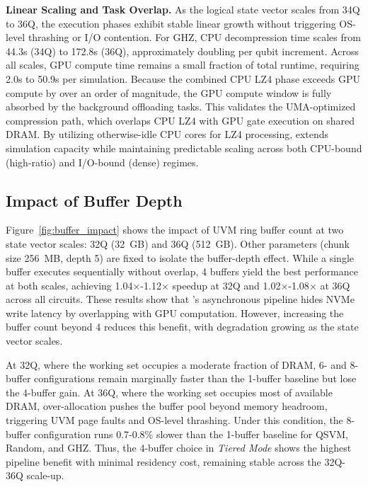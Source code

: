 \noindent\textbf{Linear Scaling and Task Overlap. }As the logical state vector scales from 34Q to 36Q, the execution phases exhibit stable linear growth without triggering OS-level thrashing or I/O contention. For GHZ, CPU decompression time scales from 44.3s (34Q) to 172.8s (36Q), approximately doubling per qubit increment. Across all scales, GPU compute time remains a small fraction of total runtime, requiring 2.0s to 50.9s per simulation. Because the combined CPU LZ4 phase exceeds GPU compute by over an order of magnitude, the GPU compute window is fully absorbed by the background offloading tasks. This validates the UMA-optimized compression path, which overlaps CPU LZ4 with GPU gate execution on shared DRAM. By utilizing otherwise-idle CPU cores for LZ4 processing, \EdgeQuantum extends simulation capacity while maintaining predictable scaling across both CPU-bound (high-ratio) and I/O-bound (dense) regimes.



\subsection{Impact of Buffer Depth}
Figure~\ref{fig:buffer_impact} shows the impact of UVM ring buffer count at two state vector scales: 32Q (32~GB) and 36Q (512~GB). Other parameters (chunk size 256~MB, depth 5) are fixed to isolate the buffer-depth effect. While a single buffer executes sequentially without overlap, 4 buffers yield the best performance at both scales, achieving 1.04$\times$-1.12$\times$ speedup at 32Q and 1.02$\times$-1.08$\times$ at 36Q across all circuits. These results show that \EdgeQuantum's asynchronous pipeline hides NVMe write latency by overlapping with GPU computation. However, increasing the buffer count beyond 4 reduces this benefit, with degradation growing as the state vector scales.

At 32Q, where the working set occupies a moderate fraction of DRAM, 6- and 8-buffer configurations remain marginally faster than the 1-buffer baseline but lose the 4-buffer gain. At 36Q, where the working set occupies most of available DRAM, over-allocation pushes the buffer pool beyond memory headroom, triggering UVM page faults and OS-level thrashing. Under this condition, the 8-buffer configuration runs 0.7-0.8\% slower than the 1-buffer baseline for QSVM, Random, and GHZ. Thus, the 4-buffer choice in \textit{Tiered Mode} shows the highest pipeline benefit with minimal residency cost, remaining stable across the 32Q-36Q scale-up.

